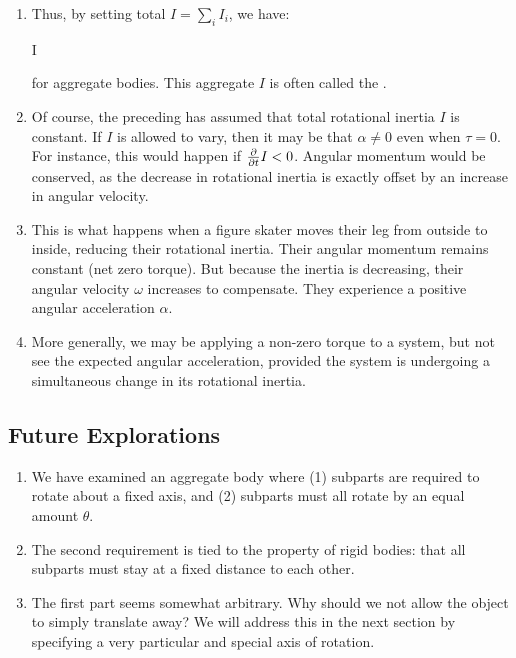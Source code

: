 \begin{enumerate}
  \item Thus, by setting total $I = \sum_i I_i$, we have:

  \begin{nedqn}
    \tau
  \eqcol
    I \alpha
  \end{nedqn}

  \noindent
  for aggregate bodies. This aggregate $I$ is often called the
  .

  \item Of course, the preceding has assumed that total rotational
  inertia $I$ is constant. If $I$ is allowed to vary, then it may be
  that $\alpha \ne 0$ even when $\tau = 0$. For instance, this would
  happen if $\frac{\partial }{\partial t} I < 0$. Angular momentum would be conserved,
  as the decrease in rotational inertia is exactly offset by an increase
  in angular velocity.

  \item This is what happens when a figure skater moves their leg from
  outside to inside, reducing their rotational inertia. Their angular
  momentum remains constant (net zero torque). But because the inertia
  is decreasing, their angular velocity $\omega$ increases to
  compensate. They experience a positive angular acceleration $\alpha$.

  \item More generally, we may be applying a non-zero torque to a
  system, but not see the expected angular acceleration, provided the
  system is undergoing a simultaneous change in its rotational inertia.
\end{enumerate}

\subsection{Future Explorations}

\begin{enumerate}
  \item We have examined an aggregate body where (1) subparts are
  required to rotate about a fixed axis, and (2) subparts must all
  rotate by an equal amount $\theta$.

  \item The second requirement is tied to the property of rigid bodies:
  that all subparts must stay at a fixed distance to each other.

  \item The first part seems somewhat arbitrary. Why should we not allow
  the object to simply translate away? We will address this in the next
  section by specifying a very particular and special axis of rotation.
\end{enumerate}

